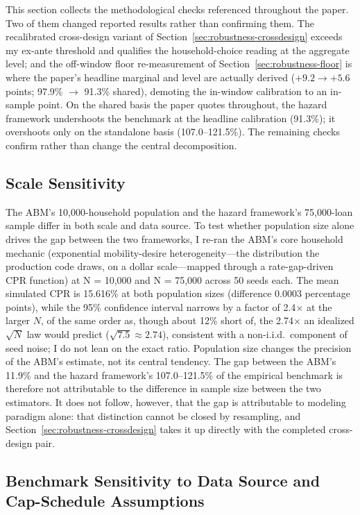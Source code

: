 \documentclass[12pt]{article}
\begin{document}
This section collects the methodological checks referenced throughout the paper. Two of them changed reported results rather than confirming them. The recalibrated cross-design variant of Section~\ref{sec:robustness-crossdesign} exceeds my ex-ante threshold and qualifies the household-choice reading at the aggregate level; and the off-window floor re-measurement of Section~\ref{sec:robustness-floor} is where the paper's headline marginal and level are actually derived ($+9.2 \to +5.6$ points; 97.9\% $\to$ 91.3\% shared), demoting the in-window calibration to an in-sample point. On the shared basis the paper quotes throughout, the hazard framework undershoots the benchmark at the headline calibration (91.3\%); it overshoots only on the standalone basis (107.0--121.5\%). The remaining checks confirm rather than change the central decomposition.

\subsection{Scale Sensitivity}\label{sec:robustness-scale}

The ABM's 10,000-household population and the hazard framework's 75,000-loan sample differ in both scale and data source. To test whether population size alone drives the gap between the two frameworks, I re-ran the ABM's core household mechanic (exponential mobility-desire heterogeneity---the distribution the production code draws, on a dollar scale---mapped through a rate-gap-driven CPR function) at N = 10,000 and N = 75,000 across 50 seeds each. The mean simulated CPR is 15.616\% at both population sizes (difference 0.0003 percentage points), while the 95\% confidence interval narrows by a factor of 2.4$\times$ at the larger $N$, of the same order as, though about 12\% short of, the 2.74$\times$ an idealized $\sqrt{N}$ law would predict ($\sqrt{7.5} \approx 2.74$), consistent with a non-i.i.d.\ component of seed noise; I do not lean on the exact ratio. Population size changes the precision of the ABM's estimate, not its central tendency. The gap between the ABM's 11.9\% and the hazard framework's 107.0--121.5\% of the empirical benchmark is therefore not attributable to the difference in sample size between the two estimators. It does not follow, however, that the gap is attributable to modeling paradigm alone: that distinction cannot be closed by resampling, and Section~\ref{sec:robustness-crossdesign} takes it up directly with the completed cross-design pair.

\subsection{Benchmark Sensitivity to Data Source and Cap-Schedule Assumptions}\label{sec:robustness-benchmark}
\end{document}
